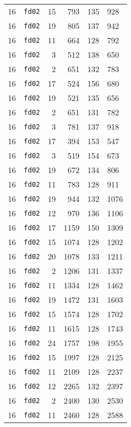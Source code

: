 \documentclass{article}
\begin{document}
\begin{table}[h!]
\begin{tabular}{llrrrl}
    16 & \texttt{fd02} & 15 & 793 & 135 & 928 \\
    16 & \texttt{fd02} & 19 & 805 & 137 & 942 \\
    16 & \texttt{fd02} & 11 & 664 & 128 & 792 \\
    16 & \texttt{fd02} & 3 & 512 & 138 & 650 \\
    16 & \texttt{fd02} & 2 & 651 & 132 & 783 \\
    16 & \texttt{fd02} & 17 & 524 & 156 & 680 \\
    16 & \texttt{fd02} & 19 & 521 & 135 & 656 \\
    16 & \texttt{fd02} & 2 & 651 & 131 & 782 \\
    16 & \texttt{fd02} & 3 & 781 & 137 & 918 \\
    16 & \texttt{fd02} & 17 & 394 & 153 & 547 \\
    16 & \texttt{fd02} & 3 & 519 & 154 & 673 \\
    16 & \texttt{fd02} & 19 & 672 & 134 & 806 \\
    16 & \texttt{fd02} & 11 & 783 & 128 & 911 \\
    16 & \texttt{fd02} & 19 & 944 & 132 & 1076 \\
    16 & \texttt{fd02} & 12 & 970 & 136 & 1106 \\
    16 & \texttt{fd02} & 17 & 1159 & 150 & 1309 \\
    16 & \texttt{fd02} & 15 & 1074 & 128 & 1202 \\
    16 & \texttt{fd02} & 20 & 1078 & 133 & 1211 \\
    16 & \texttt{fd02} & 2 & 1206 & 131 & 1337 \\
    16 & \texttt{fd02} & 11 & 1334 & 128 & 1462 \\
    16 & \texttt{fd02} & 19 & 1472 & 131 & 1603 \\
    16 & \texttt{fd02} & 15 & 1574 & 128 & 1702 \\
    16 & \texttt{fd02} & 11 & 1615 & 128 & 1743 \\
    16 & \texttt{fd02} & 24 & 1757 & 198 & 1955 \\
    16 & \texttt{fd02} & 15 & 1997 & 128 & 2125 \\
    16 & \texttt{fd02} & 11 & 2109 & 128 & 2237 \\
    16 & \texttt{fd02} & 12 & 2265 & 132 & 2397 \\
    16 & \texttt{fd02} & 2 & 2400 & 130 & 2530 \\
    16 & \texttt{fd02} & 11 & 2460 & 128 & 2588 \\

\end{tabular}
\end{table}
\end{document}
